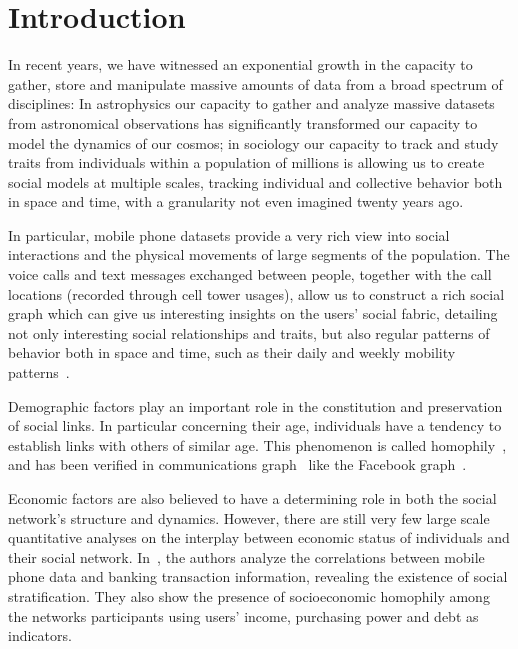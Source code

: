 \section{Introduction}


In recent years, we have witnessed an exponential growth in the capacity to gather, store and manipulate massive amounts of data from a broad spectrum of disciplines: In astrophysics our capacity to gather and analyze massive datasets from astronomical observations has significantly transformed our capacity to model the dynamics of our cosmos; in sociology our capacity to track and study traits from individuals within a population of millions is allowing us to create social models at multiple scales, tracking individual and collective behavior both in space and time, with a granularity not even imagined twenty years ago.


In particular, mobile phone datasets provide a very rich view into social interactions and the physical movements of large segments of the population. The voice calls and text messages exchanged between people, together with the call locations (recorded through cell tower usages), allow us to construct a rich social graph which can give us interesting insights on the users' social fabric, detailing not only interesting social relationships and traits, but also regular patterns of behavior both in space and time, such as their daily and weekly mobility patterns~\cite{gonzalez2008understanding,ponieman2013human,sarraute2015city}.

Demographic factors play an important role in the constitution and preservation of social links. In particular concerning their age, individuals have a tendency to
establish links with others of similar age. This phenomenon is called homophily~\cite{mcpherson2001birds}, and has been verified in communications graph~\cite{blumenstock2010mobile,sarraute2014} like the Facebook graph~\cite{ugander2011anatomy}.


Economic factors are also believed to have a determining role in both the social network's structure and dynamics. However, there are still very few large scale quantitative analyses on the interplay between economic status of individuals and their social network. In~\cite{leo2015socioeconomic}, the authors analyze the correlations between mobile phone data and banking transaction information, revealing the existence of social stratification. They also show the presence of socioeconomic homophily among the networks participants using users' income, purchasing power and debt as indicators.


